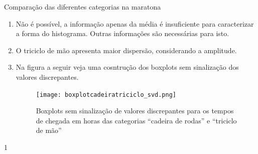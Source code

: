 \clearmargin
\begin{answer}{Comparação das diferentes categorias na maratona}
{
\begin{enumerate}
\item Não é possível, a informação apenas da média é insuficiente para caracterizar a forma do histograma. Outras informações são necessárias para isto.
\item O triciclo de mão apresenta maior dispersão, considerando a amplitude.
\item Na figura a seguir veja uma cosntrução dos boxplots sem sinalização dos valores discrepantes.
\begin{figure}[H]
\centering

\texttt{[image: boxplotcadeiratriciclo\_svd.png]}
\caption{Boxplots sem sinalização de valores discrepantes para os tempos de chegada em horas das categorias “cadeira de rodas”{} e “triciclo de mão”}
\label{}
\end{figure}
\end{enumerate}
}{1}
\end{answer}

